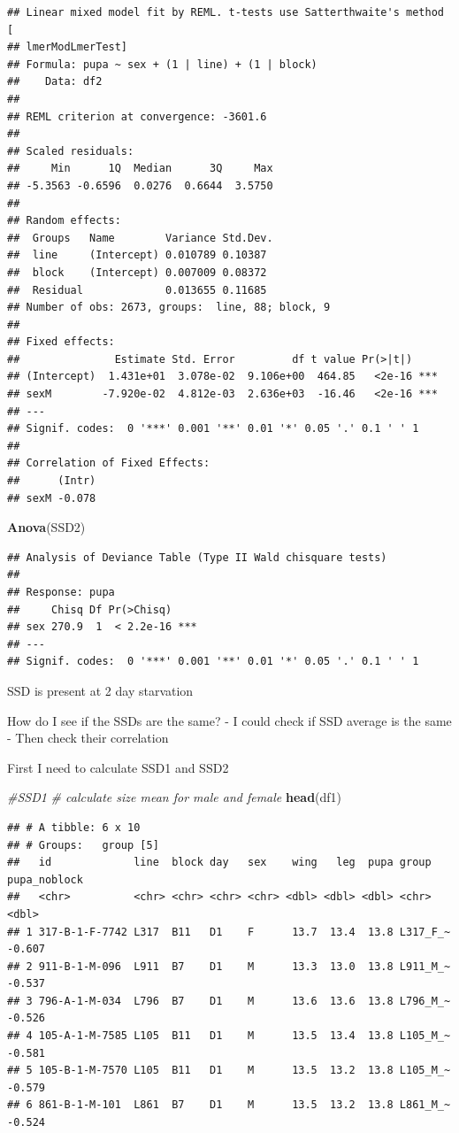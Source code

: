 \documentclass[
]{article}
\newenvironment{Shaded}{\begin{snugshade}}{\end{snugshade}}
\newcommand{\CommentTok}[1]{\textcolor[rgb]{0.56,0.35,0.01}{\textit{#1}}}
\newcommand{\KeywordTok}[1]{\textcolor[rgb]{0.13,0.29,0.53}{\textbf{#1}}}
\newcommand{\NormalTok}[1]{#1}
\begin{document}
\begin{verbatim}
## Linear mixed model fit by REML. t-tests use Satterthwaite's method [
## lmerModLmerTest]
## Formula: pupa ~ sex + (1 | line) + (1 | block)
##    Data: df2
## 
## REML criterion at convergence: -3601.6
## 
## Scaled residuals: 
##     Min      1Q  Median      3Q     Max 
## -5.3563 -0.6596  0.0276  0.6644  3.5750 
## 
## Random effects:
##  Groups   Name        Variance Std.Dev.
##  line     (Intercept) 0.010789 0.10387 
##  block    (Intercept) 0.007009 0.08372 
##  Residual             0.013655 0.11685 
## Number of obs: 2673, groups:  line, 88; block, 9
## 
## Fixed effects:
##               Estimate Std. Error         df t value Pr(>|t|)    
## (Intercept)  1.431e+01  3.078e-02  9.106e+00  464.85   <2e-16 ***
## sexM        -7.920e-02  4.812e-03  2.636e+03  -16.46   <2e-16 ***
## ---
## Signif. codes:  0 '***' 0.001 '**' 0.01 '*' 0.05 '.' 0.1 ' ' 1
## 
## Correlation of Fixed Effects:
##      (Intr)
## sexM -0.078
\end{verbatim}

\begin{Shaded}
\begin{Highlighting}[]
\KeywordTok{Anova}\NormalTok{(SSD2)}
\end{Highlighting}
\end{Shaded}

\begin{verbatim}
## Analysis of Deviance Table (Type II Wald chisquare tests)
## 
## Response: pupa
##     Chisq Df Pr(>Chisq)    
## sex 270.9  1  < 2.2e-16 ***
## ---
## Signif. codes:  0 '***' 0.001 '**' 0.01 '*' 0.05 '.' 0.1 ' ' 1
\end{verbatim}

SSD is present at 2 day starvation

How do I see if the SSDs are the same? - I could check if SSD average is
the same - Then check their correlation

First I need to calculate SSD1 and SSD2

\begin{Shaded}
\begin{Highlighting}[]
\CommentTok{#SSD1}
\CommentTok{# calculate size mean for male and female}
\KeywordTok{head}\NormalTok{(df1)}
\end{Highlighting}
\end{Shaded}

\begin{verbatim}
## # A tibble: 6 x 10
## # Groups:   group [5]
##   id             line  block day   sex    wing   leg  pupa group    pupa_noblock
##   <chr>          <chr> <chr> <chr> <chr> <dbl> <dbl> <dbl> <chr>           <dbl>
## 1 317-B-1-F-7742 L317  B11   D1    F      13.7  13.4  13.8 L317_F_~       -0.607
## 2 911-B-1-M-096  L911  B7    D1    M      13.3  13.0  13.8 L911_M_~       -0.537
## 3 796-A-1-M-034  L796  B7    D1    M      13.6  13.6  13.8 L796_M_~       -0.526
## 4 105-A-1-M-7585 L105  B11   D1    M      13.5  13.4  13.8 L105_M_~       -0.581
## 5 105-B-1-M-7570 L105  B11   D1    M      13.5  13.2  13.8 L105_M_~       -0.579
## 6 861-B-1-M-101  L861  B7    D1    M      13.5  13.2  13.8 L861_M_~       -0.524
\end{verbatim}
\end{document}
